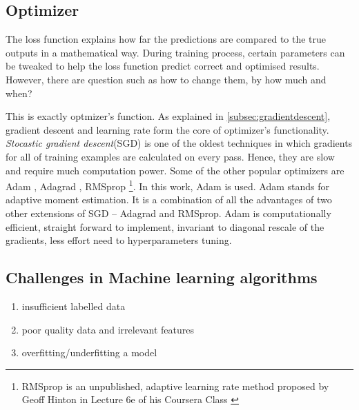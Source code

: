 \subsection{Optimizer}
\label{subsec:optimizer}
The loss function explains how far the predictions are compared to the true
outputs in a mathematical way. During training process, certain parameters can be tweaked
to help the loss function predict correct and optimised results. However, there are
question such as how to change them, by how much and when?

This is exactly optmizer's function. As explained in \ref{subsec:gradientdescent}, gradient
descent and learning rate form the core of optimizer's functionality. \textit{Stocastic
gradient descent}(SGD) is one of the oldest techniques in which gradients for all of
training examples are calculated on every pass. Hence, they are slow
and require much computation power. Some of the other popular optimizers are Adam
\cite{kingma2014adam}, Adagrad \cite{adagradpaper}, RMSprop \footnote{RMSprop is an unpublished, adaptive learning rate
method proposed by Geoff Hinton in Lecture 6e of his Coursera Class \cite{RMSProp}}. In this work, Adam is used. Adam stands for adaptive moment estimation.
It is a combination of all the advantages of two other extensions of SGD -- Adagrad and
RMSprop. Adam is computationally efficient, straight forward to implement, invariant to
diagonal rescale of the gradients, less effort need to hyperparameters tuning.

\subsection{Challenges in Machine learning algorithms}
\begin{enumerate}
    \item insufficient labelled data
    \item poor quality data and irrelevant features
    \item overfitting/underfitting a model
\end{enumerate}

